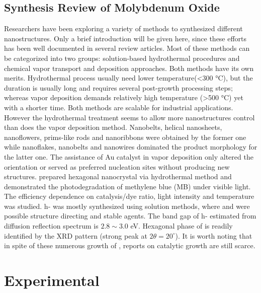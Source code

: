 \subsection{Synthesis Review of Molybdenum Oxide}

Researchers have been exploring a variety of methods to synthesized different  nanostructures. Only a brief introduction will be given here, since these efforts has been well documented in several review articles.\cite{He2003} Most of these methods can be categorized into two groups: solution-based hydrothermal procedures \citep{Li2002b,Xia2006,Li2006a,Camacho-Bragado2006} and chemical vapor transport and deposition approaches.\citep{Zeng1998,Li2002c,Li2002d,Zhou2003b,Fibers2007,Yan2009} Both methods have its own merits. Hydrothermal process usually need lower temperature(\textless 300 \si{\degreeCelsius}), but the duration is usually long and requires several post-growth processing steps; whereas vapor deposition demands relatively high temperature (\textgreater 500 \si{\degreeCelsius}) yet with a shorter time. Both methods are scalable for industrial applications. However the hydrothermal treatment seems to allow more  nanostructures control than does the vapor deposition method. Nanobelts,\cite{Li2002b} helical nanosheets, nanoflowers, prims-like rods\cite{Li2006a} and nanoribbons\cite{Camacho-Bragado2006} were obtained by the former one while nanoflakes,\cite{Chen2009} nanobelts\cite{Hu2009} and nanowires\citep{Zhou2003b,Chen2011b} dominated the product morphology for the latter one. The assistance of Au catalyst in vapor deposition only altered the orientation\cite{Yan2009} or served as preferred nucleation sites\cite{Cai2011} without producing new  structures. \citeauthor{Chithambararaj2013} prepared hexagonal  nanocrystal via hydrothermal method and demonstrated the photodegradation of methylene blue (MB) under visible light.\cite{Chithambararaj2013} The efficiency dependence on catalysis/dye ratio, light intensity and temperature was studied. h- was mostly synthesized using solution methods, where  and  were possible structure directing and stable agents. The band gap of h- estimated from diffusion reflection spectrum is $2.8\sim3.0$ eV. Hexagonal phase of  is readily identified by the XRD pattern (strong peak at $2\theta=20^{\circ}$). It is worth noting that in spite of these numerous growth of , reports on catalytic growth are still scarce. 

\section{Experimental}\label{sec:grow}

